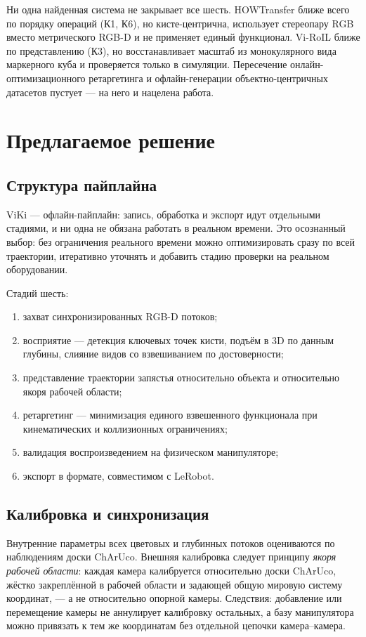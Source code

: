 \documentclass[12pt, a4paper, oneside]{report}
\begin{document}
Ни одна найденная система не закрывает все шесть. HOWTransfer ближе всего по
порядку операций (К1, К6), но кисте-центрична, использует стереопару RGB вместо
метрического RGB-D и не применяет единый функционал. Vi-RoIL ближе по
представлению (К3), но восстанавливает масштаб из монокулярного вида маркерного
куба и проверяется только в симуляции. Пересечение онлайн-оптимизационного
ретаргетинга и офлайн-генерации объектно-центричных датасетов пустует --- на него
и нацелена работа.

\chapter{Предлагаемое решение}

\section{Структура пайплайна}

ViKi --- офлайн-пайплайн: запись, обработка и экспорт идут отдельными стадиями, и
ни одна не обязана работать в реальном времени. Это осознанный выбор: без
ограничения реального времени можно оптимизировать сразу по всей траектории,
итеративно уточнять и добавить стадию проверки на реальном оборудовании.

Стадий шесть:
\begin{enumerate}[leftmargin=2.2em]
  \item захват синхронизированных RGB-D потоков;
  \item восприятие --- детекция ключевых точек кисти, подъём в 3D по данным
        глубины, слияние видов со взвешиванием по достоверности;
  \item представление траектории запястья относительно объекта и относительно
        якоря рабочей области;
  \item ретаргетинг --- минимизация единого взвешенного функционала при
        кинематических и коллизионных ограничениях;
  \item валидация воспроизведением на физическом манипуляторе;
  \item экспорт в формате, совместимом с LeRobot.
\end{enumerate}

\section{Калибровка и синхронизация}

Внутренние параметры всех цветовых и глубинных потоков оцениваются по наблюдениям
доски ChArUco. Внешняя калибровка следует принципу \emph{якоря рабочей области}:
каждая камера калибруется относительно доски ChArUco, жёстко закреплённой в
рабочей области и задающей общую мировую систему координат, --- а не относительно
опорной камеры. Следствия: добавление или перемещение камеры не аннулирует
калибровку остальных, а базу манипулятора можно привязать к тем же координатам без
отдельной цепочки камера--камера.
\end{document}
